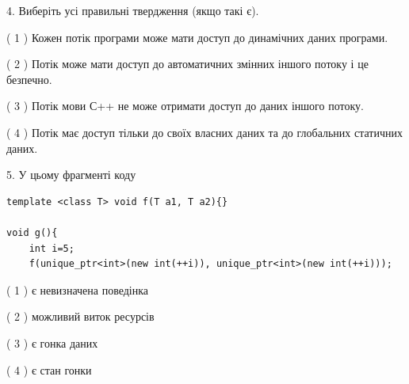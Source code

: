 \documentclass[12pt, ukrainian]{article}
\begin{document}
\begin {large}
{%
4. Виберіть усі правильні твердження (якщо такі є).\par
\vspace{2mm}

( 1 ) Кожен потік програми може мати доступ до динамічних даних програми.%

( 2 ) Потік може мати доступ до автоматичних змінних іншого потоку і це безпечно.%

( 3 ) Потік мови С++ не може отримати доступ до даних іншого потоку.%

( 4 ) Потік має доступ тільки до своїх власних даних та до глобальних статичних даних.%


5. У цьому фрагменті коду
\begin{verbatim}
template <class T> void f(T a1, T a2){}

void g(){
    int i=5;
    f(unique_ptr<int>(new int(++i)), unique_ptr<int>(new int(++i)));
\end{verbatim}

( 1 ) є невизначена поведінка%

( 2 ) можливий виток ресурсів%

( 3 ) є гонка даних%

( 4 ) є стан гонки%
}
\end {large}
\end{document}
